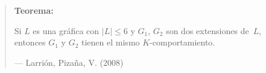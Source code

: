 \documentclass[beamer]{standalone}
\begin{document}
\begin{standaloneframe}
  \begin{quote}
    \textbf{Teorema:}

    Si $L$ es una gráfica con $|L|\leq 6$ y $G_{1}$, $G_{2}$ son dos
    extensiones de~$L$, entonces $G_{1}$ y $G_{2}$ tienen el
    mismo $K$-comportamiento.

    \hfill--- \color{purple} Larrión, Pizaña, V. (2008)
  \end{quote}
\end{standaloneframe}
\end{document}
